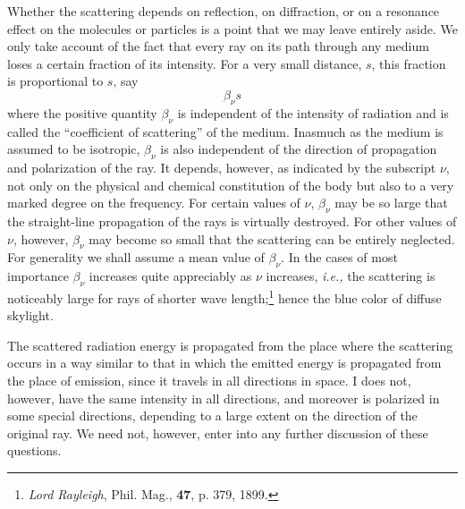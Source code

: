 \documentclass[12pt,oneside]{book}
\begin{document}
Whether the scattering depends on reflection, on diffraction, or on a resonance effect on the molecules or particles is a point that we may leave entirely aside. We only take account of the fact that every ray on its path through any medium loses a certain fraction of its intensity. For a very small distance, $s$, this fraction is proportional to $s$, say
\begin{equation}
    \beta_\nu s
    \label{eq3}
\end{equation}
where the positive quantity $\beta_\nu$ is independent of the intensity of radiation and is called the ``coefficient of scattering'' of the medium. Inasmuch as the medium is assumed to be isotropic, $\beta_\nu$ is also independent of the direction of propagation and polarization of the ray. It depends, however, as indicated by the subscript $\nu$, not only on the physical and chemical constitution of the body but also to a very marked degree on the frequency. For certain values of $\nu$, $\beta_\nu$ may be so large that the straight-line propagation of the rays is virtually destroyed. For other values of $\nu$, however, $\beta_\nu$ may become so small that the scattering can be entirely neglected. For generality we shall assume a mean value of $\beta_\nu$. In the cases of most importance $\beta_\nu$ increases quite appreciably as $\nu$ increases, \textit{i.e.,} the scattering is noticeably large for rays of shorter wave length;\footnote{\textit{Lord Rayleigh}, Phil. Mag., \textbf{47}, p. 379, 1899.} hence the blue color of diffuse skylight. \par

The scattered radiation energy is propagated from the place where the scattering occurs in a way similar to that in which the emitted energy is propagated from the place of emission, since it travels in all directions in space. I does not, however, have the same intensity in all directions, and moreover is polarized in some special directions, depending to a large extent on the direction of the original ray. We need not, however, enter into any further discussion of these questions. \par
\end{document}
